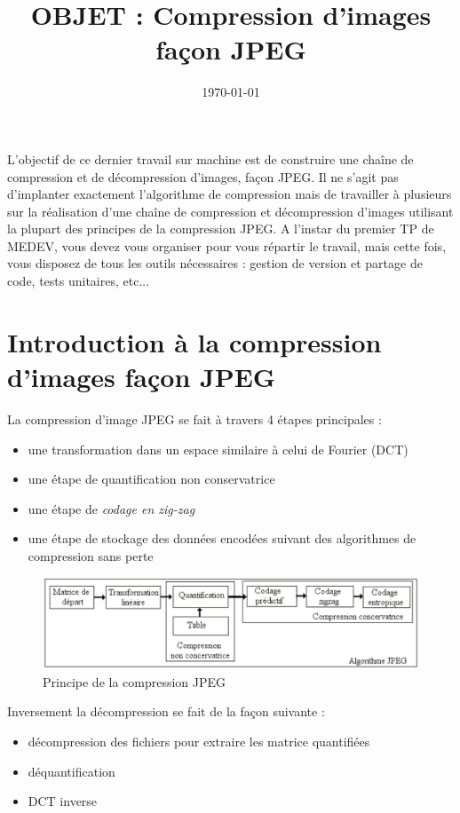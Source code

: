 \documentclass[a4paper,10pt]{article}
\title{OBJET : Compression d'images façon JPEG}
\date{\today}
\author{}
\begin{document}
\maketitle

L'objectif de ce dernier travail sur machine est de construire une chaîne de compression et de décompression d'images, façon JPEG. Il ne s'agit pas d'implanter exactement l'algorithme de compression mais de travailler à plusieurs sur la réalisation d'une chaîne de compression et décompression d'images utilisant la plupart des principes de la compression JPEG. A l'instar du premier TP de MEDEV, vous devez vous organiser pour vous répartir le travail, mais cette fois, vous disposez de tous les outils nécessaires : gestion de version et partage de code, tests unitaires, etc...


\section{Introduction à la compression d'images façon JPEG}

La compression d'image JPEG\cite{JPEG} se fait à travers 4 étapes principales :
\begin{itemize}
\item une transformation dans un espace similaire à celui de Fourier (DCT)
\item une étape de quantification non conservatrice
\item une étape de \emph{codage en zig-zag}
\item une étape de stockage des données encodées suivant des algorithmes de compression sans perte
\end{itemize}

\begin{figure}[htbp]
\begin{center}
	\includegraphics[width=\textwidth]{jpeg.pdf}
\caption{Principe de la compression JPEG}
\label{default}
\end{center}
\end{figure}

Inversement la décompression se fait de la façon suivante : 
\begin{itemize}
\item décompression des fichiers pour extraire les matrice quantifiées
\item déquantification
\item DCT inverse
\end{itemize}
\end{document}
